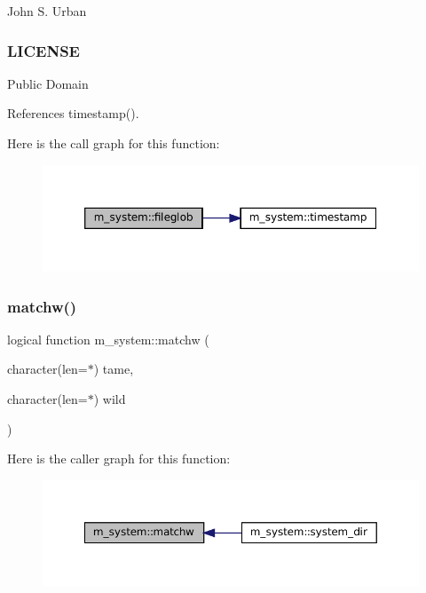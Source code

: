John S. Urban \subsubsection*{L\+I\+C\+E\+N\+SE}

Public Domain 

References timestamp().

Here is the call graph for this function\+:\nopagebreak
\begin{figure}[H]
\begin{center}
\leavevmode
\includegraphics[width=350pt]{namespacem__system_a79656f76ad75168302e0d770052e901e_cgraph}
\end{center}
\end{figure}
\mbox{\label{namespacem__system_a0fccb69d0a56044b05e85b8df9f90aea}} 
\subsubsection{\texorpdfstring{matchw()}{matchw()}}
{\footnotesize\ttfamily logical function m\+\_\+system\+::matchw (\begin{DoxyParamCaption}\item[{character(len=$\ast$)}]{tame,  }\item[{character(len=$\ast$)}]{wild }\end{DoxyParamCaption})}

Here is the caller graph for this function\+:\nopagebreak
\begin{figure}[H]
\begin{center}
\leavevmode
\includegraphics[width=350pt]{namespacem__system_a0fccb69d0a56044b05e85b8df9f90aea_icgraph}
\end{center}
\end{figure}
\mbox{\label{namespacem__system_ad813765403a5d9d6fb7a2edcb669fe4b}} 
